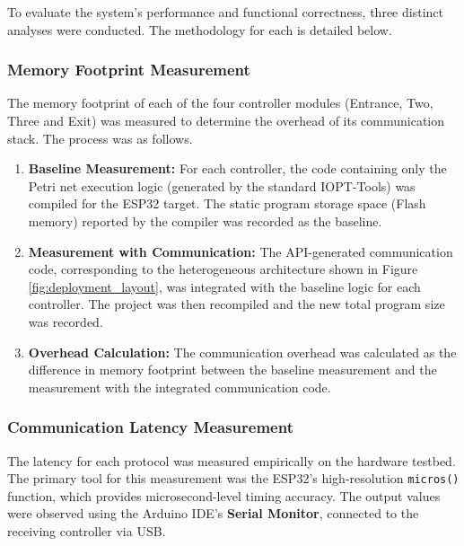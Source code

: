 To evaluate the system's performance and functional correctness, three distinct analyses were conducted. The methodology for each is detailed below.

\subsubsection{Memory Footprint Measurement}
\label{subsubsec:memory_methodology}

The memory footprint of each of the four controller modules (Entrance, Two, Three and Exit) was measured to determine the overhead of its communication stack. The process was as follows.
\begin{enumerate}
    \item \textbf{Baseline Measurement:} For each controller, the code containing only the Petri net execution logic (generated by the standard IOPT-Tools) was compiled for the ESP32 target. The static program storage space (Flash memory) reported by the compiler was recorded as the baseline.
    \item \textbf{Measurement with Communication:} The API-generated communication code, corresponding to the heterogeneous architecture shown in Figure \ref{fig:deployment_layout}, was integrated with the baseline logic for each controller. The project was then recompiled and the new total program size was recorded.
    \item \textbf{Overhead Calculation:} The communication overhead was calculated as the difference in memory footprint between the baseline measurement and the measurement with the integrated communication code.
\end{enumerate}

\subsubsection{Communication Latency Measurement}
\label{subsubsec:latency_methodology}

The latency for each protocol was measured empirically on the hardware testbed. The primary tool for this measurement was the ESP32's high-resolution \texttt{micros()} function, which provides microsecond-level timing accuracy. The output values were observed using the Arduino IDE's \textbf{Serial Monitor}, connected to the receiving controller via USB.

